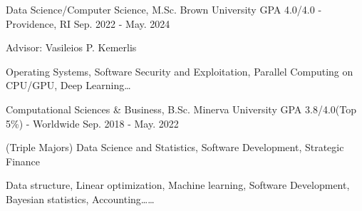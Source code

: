 \begin{cventries}
  \cventry
    {Data Science/Computer Science, M.Sc.}
    {Brown University}
    {GPA 4.0/4.0 - Providence, RI}
    {Sep. 2022 - May. 2024}
    {
    \begin{cvitems}
        \item {Advisor: Vasileios P. Kemerlis}
        \item {Operating Systems, Software Security and Exploitation, Parallel Computing on CPU/GPU, Deep Learning…}
    \end{cvitems}
    }

  \cventry
    {Computational Sciences \& Business, B.Sc.}
    {Minerva University}
    {GPA 3.8/4.0(Top 5\%) - Worldwide}
    {Sep. 2018 - May. 2022}
    {
      \begin{cvitems}
        \item {(Triple Majors) Data Science and Statistics, Software Development, Strategic Finance}
        \item {Data structure, Linear optimization, Machine learning, Software Development, Bayesian statistics, Accounting……}
      \end{cvitems}
    }
\end{cventries}
